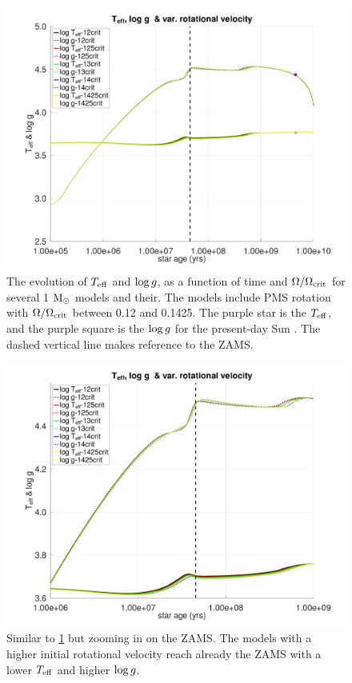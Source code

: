 \documentclass[fleqn,usenatbib]{mnras}
\begin{document}
\begin{figure}
	\includegraphics[clip,width=\columnwidth]{figures/paper2/teff_logg_var_vel_g3.pdf}
    \caption{The evolution of $T_{\mathrm{eff}}$ and $\mathrm{log} \, g$, as a function of time and $\Omega / \Omega_{\mathrm{crit}}$ for several 1 $\mathrm{M}_\odot$ models and their. The models include PMS rotation with $\Omega / \Omega_{\mathrm{crit}}$ between 0.12 and 0.1425. The purple star is the $T_{\mathrm{eff}}$, and the purple square is the $\mathrm{log} \, g$ for the present-day Sun \citep{Gill2012}. The dashed vertical line makes reference to the ZAMS.}
    \label{fig:teff_logg_var_vel_g3}
\end{figure}

\begin{figure}
	\includegraphics[clip,width=\columnwidth]{figures/paper2/teff_logg_var_vel_g_z13.pdf}
    \caption{Similar to \ref{fig:teff_logg_var_vel_g3} but zooming in on the ZAMS. The models with a higher initial rotational velocity reach already the ZAMS with a lower $T_{\mathrm{eff}}$ and higher $\mathrm{log} \, g$.}
    \label{fig:teff_logg_var_vel_g_z13}
\end{figure}
\end{document}
